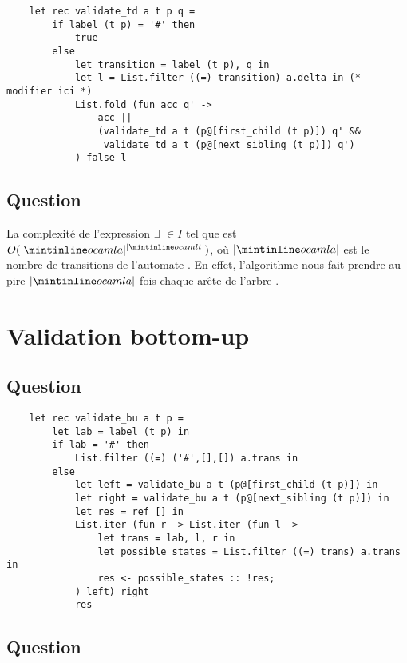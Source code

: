 \documentclass[twoside,12pt]{article}
\begin{document}
  \begin{verbatim}
    let rec validate_td a t p q =
        if label (t p) = '#' then
            true
        else
            let transition = label (t p), q in
            let l = List.filter ((=) transition) a.delta in (* modifier ici *)
            List.fold (fun acc q' ->
                acc ||
                (validate_td a t (p@[first_child (t p)]) q' &&
                 validate_td a t (p@[next_sibling (t p)]) q')
            ) false l
   \end{verbatim}

\subsection{Question}

La complexité de l'expression
$\exists$  $\in I$ tel que 
est $O(|\ocaml{a}|^{|\ocaml{t}|})$, où $|\ocaml{a}|$ est le nombre de
transitions de l'automate . En effet, l'algorithme
nous fait prendre au pire $|\ocaml{a}|$ fois chaque arête de l'arbre .


\section{Validation bottom-up}

\subsection{Question}
  \begin{verbatim}
    let rec validate_bu a t p =
        let lab = label (t p) in
        if lab = '#' then
            List.filter ((=) ('#',[],[]) a.trans in
        else
            let left = validate_bu a t (p@[first_child (t p)]) in
            let right = validate_bu a t (p@[next_sibling (t p)]) in
            let res = ref [] in
            List.iter (fun r -> List.iter (fun l ->
                let trans = lab, l, r in
                let possible_states = List.filter ((=) trans) a.trans in
                res <- possible_states :: !res;
            ) left) right
            res
   \end{verbatim}


\subsection{Question}
\end{document}
